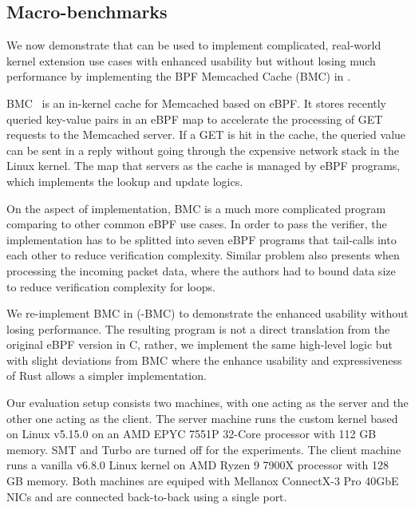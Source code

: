 \subsection{Macro-benchmarks}
\label{eval:macro}
We now demonstrate that \projname{} can be used to implement complicated,
    real-world kernel extension use cases with enhanced usability but without
    losing much performance by implementing the BPF Memcached Cache (BMC) in
    \projname{}.

%

BMC~\cite{BMC} is an in-kernel cache for Memcached based on eBPF.
It stores recently queried key-value pairs in an eBPF map to accelerate the
    processing of GET requests to the Memcached server.
If a GET is hit in the cache, the queried value can be sent in a reply without
    going through the expensive network stack in the Linux kernel.
The map that servers as the cache is managed by eBPF programs, which implements
    the lookup and update logics.

On the aspect of implementation, BMC is a much more complicated program
    comparing to other common eBPF use cases.
In order to pass the verifier, the implementation has to be splitted into seven
    eBPF programs that tail-calls into each other to reduce verification
    complexity.
Similar problem also presents when processing the incoming packet data, where
    the authors had to bound data size to reduce verification complexity for
    loops.

We re-implement BMC in \projname{} (\projname{}-BMC) to demonstrate the
    enhanced usability without losing performance.
The resulting program is not a direct translation from the original eBPF
    version in C, rather, we implement the same high-level logic but with
    slight deviations from BMC where the enhance usability and expressiveness
    of Rust allows a simpler implementation.

Our evaluation setup consists two machines, with one
    acting as the server and the other one acting as the client.
The server machine runs the \projname{} custom kernel based on Linux v5.15.0 on
    an AMD EPYC 7551P 32-Core processor with 112 GB memory.
SMT and Turbo are turned off for the experiments.
The client machine runs a vanilla v6.8.0 Linux kernel on AMD Ryzen 9 7900X
    processor with 128 GB memory.
Both machines are equiped with Mellanox ConnectX-3 Pro 40GbE NICs and are
    connected back-to-back using a single port.

